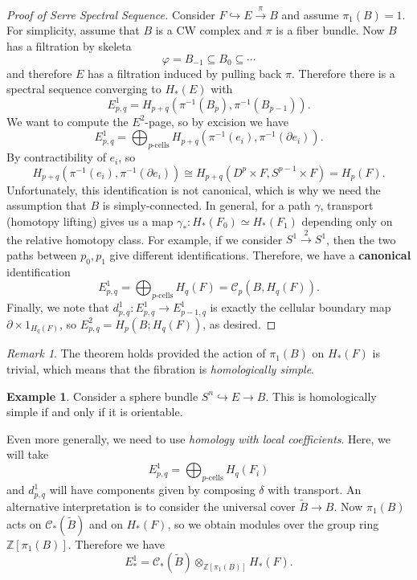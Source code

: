 \documentclass[leqno, openany]{memoir}
\theoremstyle{definition}
\newtheorem{exm}[thm]{Example}
\theoremstyle{remark}
\newtheorem{rmk}[thm]{Remark}
\theoremstyle{plain}
\theoremstyle{definition}
\theoremstyle{remark}
\newcommand{\Z}{\mathbb{Z}}
\newcommand{\mc}[1]{\mathcal{#1}}
\newcommand{\wt}[1]{\widetilde{#1}}
\begin{document}
\begin{proof}[Proof of Serre Spectral Sequence]
    Consider $F \hookrightarrow E \xrightarrow{\pi} B$ and assume $\pi_1(B) = 1$. For simplicity, assume that $B$ is a CW complex and $\pi$ is a fiber bundle. Now $B$ has a filtration by skeleta
    \[ \varphi = B_{-1} \subseteq B_0 \subseteq \cdots \]
    and therefore $E$ has a filtration induced by pulling back $\pi$. Therefore there is a spectral sequence converging to $H_*(E)$ with 
    \[ E_{p,q}^1 = H_{p+q}(\pi^{-1}(B_p), \pi^{-1}(B_{p-1})). \]
    We want to compute the $E^2$-page, so by excision we have
    \[ E_{p,q}^1 = \bigoplus_{\text{$p$-cells}} H_{p+q}(\pi^{-1}(e_i), \pi^{-1}(\partial e_i)). \]
    By contractibility of $e_i$, so 
    \[ H_{p+q}(\pi^{-1}(e_i), \pi^{-1}(\partial e_i)) \cong H_{p+q}(D^p \times F, S^{p-1} \times F) = H_p(F). \]
    Unfortunately, this identification is not canonical, which is why we need the assumption that $B$ is simply-connected. In general, for a path $\gamma$, transport (homotopy lifting) gives us a map $\gamma_* \colon H_*(F_0) \simeq H_*(F_1)$ depending only on the relative homotopy class. For example, if we consider $S^1 \xrightarrow{2} S^1$, then the two paths between $p_0, p_1$ give different identifications. Therefore, we have a \textbf{canonical} identification
    \[ E_{p,q}^1 = \bigoplus_{\text{$p$-cells}} H_q(F) = \mc{C}_p(B, H_q(F)). \]
    Finally, we note that $d_{p,q}^1 \colon E_{p,q}^1 \to E_{p-1,q}^1$ is exactly the cellular boundary map $\partial \times 1_{H_q(F)}$, so $E_{p,q}^2 = H_p(B; H_q(F))$, as desired.
\end{proof}

\begin{rmk}
    The theorem holds provided the action of $\pi_1(B)$ on $H_*(F)$ is trivial, which means that the fibration is \textit{homologically simple}. 
\end{rmk}

\begin{exm}
    Consider a sphere bundle $S^n \hookrightarrow E \to B$. This is homologically simple if and only if it is orientable.
\end{exm}

Even more generally, we need to use \textit{homology with local coefficients}. Here, we will take
\[ E_{p,q}^1 = \bigoplus_{\text{$p$-cells}} H_q(F_i) \]
and $d_{p,q}^1$ will have components given by composing $\delta$ with transport. An alternative interpretation is to consider the universal cover $\wt{B} \to B$. Now $\pi_1(B)$ acts on $\mc{C}_*(\wt{B})$ and on $H_*(F)$, so we obtain modules over the group ring $\Z[\pi_1(B)]$. Therefore we have
\[ E^1_* = \mc{C}_*(\wt{B}) \otimes_{\Z[\pi_1(B)]} H_*(F). \]
\end{document}
